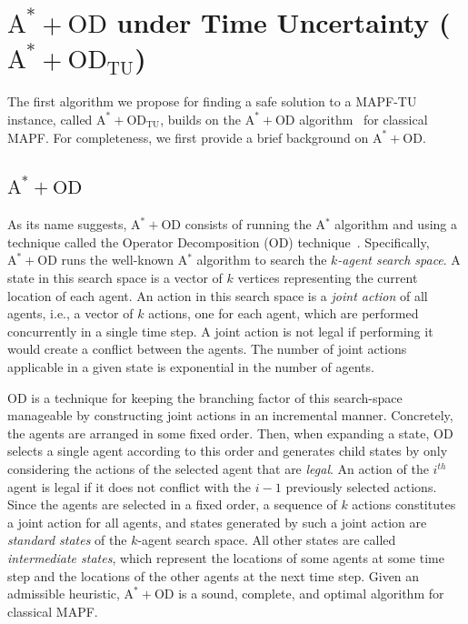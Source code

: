 \documentclass[jair,twoside,11pt,theapa]{article}
\newcommand{\astar}{A$^*$\xspace}
\newcommand{\oda}{$\mathrm{A^{*}+OD}$\xspace}
\newcommand{\odatu}{$\mathrm{A^{*}+OD_{TU}}$\xspace}
\newcommand{\mapftu}{MAPF-TU\xspace}
\begin{document}



\section{\boldmath${\mathrm{A^* + OD}}$ under Time Uncertainty (\odatu)}
\label{odatu}

The first algorithm we propose for finding a safe solution to a \mapftu instance, called \odatu, builds on the \oda algorithm~ for classical MAPF.  
For completeness, we first provide a brief background on \oda.  

\subsection{\oda}
As its name suggests, \oda consists of running the \astar{} algorithm and using a technique called the Operator Decomposition (OD) technique~. 
Specifically, \oda runs the well-known \astar{} algorithm to search the
\emph{$k$-agent search space}. 
A state in this search space is a vector of $k$ vertices representing the current location of each agent. 
An action in this search space is a \emph{joint action} of all agents, i.e., a vector of $k$ actions, one for each agent, which are performed concurrently in a single time step. 
A joint action is not legal if performing it would create a conflict between the agents. 
The number of joint actions applicable in a given state is exponential in the number of agents. 


OD is a technique for keeping the branching factor of this search-space manageable 
by constructing joint actions in an incremental manner. 
Concretely, the agents are arranged in some fixed order. 
Then, when expanding a state, OD selects a single agent according to this order and 
generates child states by only considering the actions of the selected agent that are \emph{legal}. 
An action of the $i^{th}$ agent is legal if it does not conflict with the $i-1$ previously selected actions. 
Since the agents are selected in a fixed order, a sequence of $k$ actions constitutes a joint action for all agents, 
and states generated by such a joint action are \emph{standard states} of the $k$-agent search space. 
All other states are called \emph{intermediate states}, which represent the locations of some agents at some time step
and the locations of the other agents at the next time step. 
Given an admissible heuristic, \oda is a sound, complete, and optimal algorithm for classical MAPF. 
\end{document}
